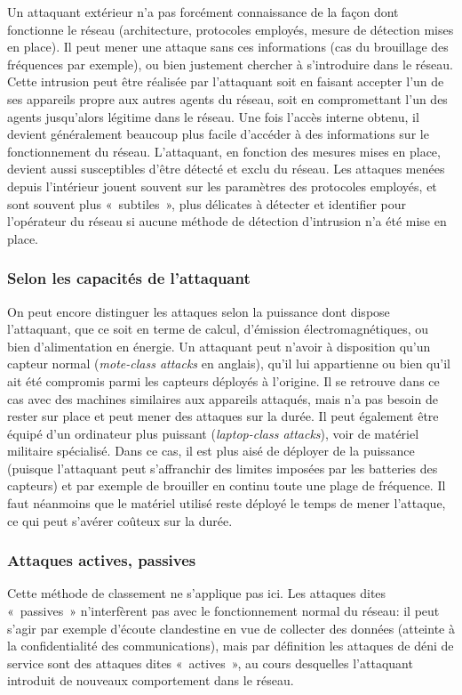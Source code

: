 Un attaquant extérieur n'a pas forcément connaissance de la façon dont fonctionne le réseau (architecture, protocoles employés, mesure de détection mises en place).
Il peut mener une attaque sans ces informations (cas du brouillage des fréquences par exemple), ou bien justement chercher à s'introduire dans le réseau.
Cette intrusion peut être réalisée par l'attaquant soit en faisant accepter l'un de ses appareils propre aux autres agents du réseau, soit en compromettant l'un des agents jusqu'alors légitime dans le réseau.
Une fois l'accès interne obtenu, il devient généralement beaucoup plus facile d'accéder à des informations sur le fonctionnement du réseau.
L'attaquant, en fonction des mesures mises en place, devient aussi susceptibles d'être détecté et exclu du réseau.
Les attaques menées depuis l'intérieur jouent souvent sur les paramètres des protocoles employés, et sont souvent plus « subtiles », plus délicates à détecter et identifier pour l'opérateur du réseau si aucune méthode de détection d'intrusion n'a été mise en place.

\subsubsection{Selon les capacités de l'attaquant}
On peut encore distinguer les attaques selon la puissance dont dispose l'attaquant, que ce soit en terme de calcul, d'émission électromagnétiques, ou bien d'alimentation en énergie.
Un attaquant peut n'avoir à disposition qu'un capteur normal (\textit{mote-class attacks} en anglais), qu'il lui appartienne ou bien qu'il ait été compromis parmi les capteurs déployés à l'origine.
Il se retrouve dans ce cas avec des machines similaires aux appareils attaqués, mais n'a pas besoin de rester sur place et peut mener des attaques sur la durée.
Il peut également être équipé d'un ordinateur plus puissant (\textit{laptop-class attacks}), voir de matériel militaire spécialisé.
Dans ce cas, il est plus aisé de déployer de la puissance (puisque l'attaquant peut s'affranchir des limites imposées par les batteries des capteurs) et par exemple de brouiller en continu toute une plage de fréquence.
Il faut néanmoins que le matériel utilisé reste déployé le temps de mener l'attaque, ce qui peut s'avérer coûteux sur la durée.

\subsubsection{Attaques actives, passives}
Cette méthode de classement ne s'applique pas ici.
Les attaques dites « passives » n'interfèrent pas avec le fonctionnement normal du réseau: il peut s'agir par exemple d'écoute clandestine en vue de collecter des données (atteinte à la confidentialité des communications), mais par définition les attaques de déni de service sont des attaques dites « actives », au cours desquelles l'attaquant introduit de nouveaux comportement dans le réseau.

